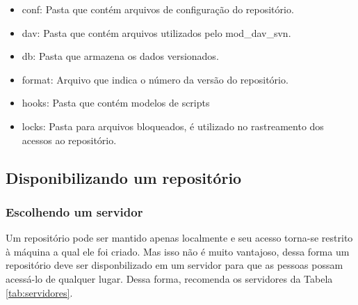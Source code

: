 \begin{itemize}

\item conf: Pasta que contém arquivos de configuração do repositório.

\item dav: Pasta que contém arquivos utilizados pelo mod\_dav\_svn.

\item db: Pasta que armazena os dados versionados.

\item format: Arquivo que indica o número da versão do repositório.

\item hooks: Pasta que contém modelos de scripts

\item locks: Pasta para arquivos bloqueados, é utilizado no rastreamento dos acessos ao repositório.

\end{itemize}

\subsection{Disponibilizando um repositório}

\subsubsection{Escolhendo um servidor}

Um repositório pode ser mantido apenas localmente e seu acesso torna-se restrito à máquina a qual ele foi criado. Mas isso não é muito vantajoso, dessa forma um repositório deve ser disponbilizado em um servidor para que as pessoas possam acessá-lo de qualquer lugar. Dessa forma, \cite{svn-book} recomenda os servidores da Tabela \ref{tab:servidores}.

